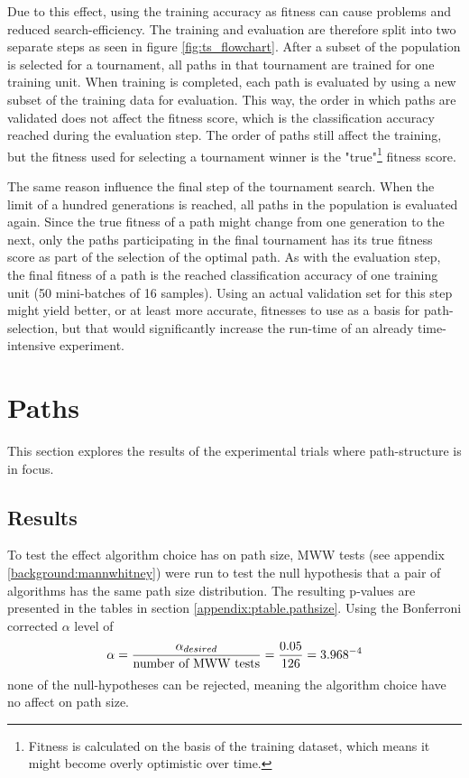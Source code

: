 Due to this effect, using the training accuracy as fitness can cause problems and reduced search-efficiency. The training and evaluation are therefore split into two separate steps as seen in figure \ref{fig:ts_flowchart}. After a subset of the population is selected for a tournament, all paths in that tournament are trained for one training unit. When training is completed, each path is evaluated by using a new subset of the training data for evaluation. This way, the order in which paths are validated does not affect the fitness score, which is the classification accuracy reached during the evaluation step. The order of paths still affect the training, but the fitness used for selecting a tournament winner is the "true"\footnote{Fitness is calculated on the basis of the training dataset, which means it might become overly optimistic over time.} fitness score.

The same reason influence the final step of the tournament search. When the limit of a hundred generations is reached, all paths in the population is evaluated again. Since the true fitness of a path might change from one generation to the next, only the paths participating in the final tournament has its true fitness score as part of the selection of the optimal path. As with the evaluation step, the final fitness of a path is the reached classification accuracy of one training unit (50 mini-batches of 16 samples). Using an actual validation set for this step might yield better, or at least more accurate, fitnesses to use as a basis for path-selection, but that would significantly increase the run-time of an already time-intensive experiment. 

\section{Paths}
This section explores the results of the experimental trials where path-structure is in focus. 

\subsection{Results}
To test the effect algorithm choice has on path size, MWW tests (see appendix \ref{background:mannwhitney}) were run to test the null hypothesis that a pair of algorithms has the same path size distribution. The resulting p-values are presented in the tables in section \ref{appendix:ptable.pathsize}. Using the Bonferroni corrected \(\alpha\) level of 
\begin{equation*}
    \alpha=\frac{\alpha_{desired}}{\text{number of MWW tests}}=\frac{0.05}{126}=3.968\time 10^{-4}
\end{equation*}
none of the null-hypotheses can be rejected, meaning the algorithm choice have no affect on path size. 

